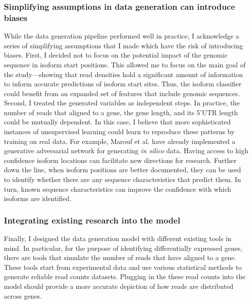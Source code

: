 \documentclass[12pt]{article}
\begin{document}
\subsubsection{Simplifying assumptions in data generation can introduce biases}
While the data generation pipeline performed well in practice, I acknowledge a series of simplifying assumptions that I made which have the risk of introducing biases. First, I decided not to focus on the potential impact of the genomic sequence in isoform start positions. This allowed me to focus on the main goal of the study---showing that read densities hold a significant amount of information to inform accurate predictions of isoform start sites. Thus, the isoform classifier could benefit from an expanded set of features that include genomic sequences. Second, I treated the generated variables as independent steps. In practice, the number of reads that aligned to a gene, the gene length, and its 5'UTR length could be mutually dependent. In this case, I believe that more sophisticated instances of unsupervised learning could learn to reproduce these patterns by training on real data. For example, Marouf et al. \cite{Marouf2020} have already implemented a generative adversarial network for generating \textit{in silico} data. Having access to high confidence isoform locations can facilitate new directions for research. Further down the line, when isoform positions are better documented, they can be used to identify whether there are any sequence characteristics that predict them. In turn, known sequence characteristics can improve the confidence with which isoforms are identified. 

\subsubsection{Integrating existing research into the model}
Finally, I designed the data generation model with different existing tools in mind. In particular, for the purpose of identifying differentially expressed genes, there are tools that simulate the number of reads that have aligned to a gene. These tools start from experimental data \cite{Griebel2012, Gerard2020} and use various statistical methods to generate reliable read counts datasets. Plugging in the these read counts into the model should provide a more accurate depiction of how reads are distributed across genes. 
\end{document}
